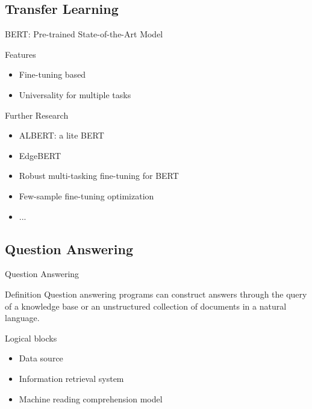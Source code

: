 \documentclass[12pt]{beamer}
\begin{document}
\subsection{Transfer Learning}
\begin{frame}{BERT: Pre-trained State-of-the-Art Model}
    \begin{block}{Features}
        \begin{itemize}
            \item Fine-tuning based
            \item Universality for multiple tasks
        \end{itemize}
    \end{block}
    
    \begin{block}{Further Research}
        \begin{itemize}
            \item ALBERT: a lite BERT
            \item EdgeBERT
            \item Robust multi-tasking fine-tuning for BERT
            \item Few-sample fine-tuning optimization
            \item ...
        \end{itemize}
    \end{block}
\end{frame}


\subsection{Question Answering}
\begin{frame}{Question Answering}
    \begin{block}{Definition}
        Question answering programs can construct answers through the query of a knowledge base or an unstructured collection of documents in a natural language.
    \end{block}
    \begin{block}{Logical blocks}
        \begin{itemize}
            \item Data source
            \item Information retrieval system 
            \item Machine reading comprehension model
        \end{itemize}
    \end{block}
\end{frame}
\end{document}
